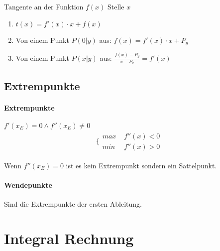 \documentclass[12pt]{article}
\begin{document}
Tangente an der Funktion \( f(x) \) Stelle \( x \)

\begin{enumerate}
	\item \( t(x) =  f'(x) \cdot x + f(x) \)
	\item Von einem Punkt \( P(0 \vert y)  \) aus: \( f(x) = f'(x) \cdot x + P_y\)
	\item Von einem Punkt \( P(x \vert y) \) aus: \( \frac{f(x) - P_y}{x - P_x} = f'(x) \)
\end{enumerate}

\subsection{ Extrempunkte }

\paragraph{ Extrempunkte } \( f'(x_E) = 0 \land f''(x_E) \neq 0  \)  
\begin{align*}
	\bigg \lbrace \begin{matrix}
		\textit{max } & f''(x) < 0 \\
		\textit{min } & f''(x) > 0
	\end{matrix}
\end{align*}

Wenn \( f''(x_E) = 0 \) ist es kein Extrempunkt sondern ein Sattelpunkt.

\paragraph{Wendepunkte} Sind die Extrempunkte der ersten Ableitung.
\section{Integral Rechnung}
\end{document}
